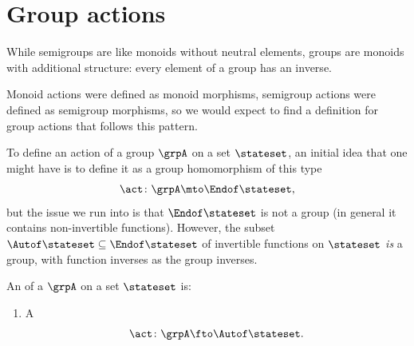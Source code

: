 
\section{Group actions}


While semigroups are like monoids without neutral elements, groups are monoids with additional structure: every element of a group has an inverse.

Monoid actions were defined as monoid morphisms, semigroup actions were defined as semigroup morphisms, so we would expect to find a definition for group actions that follows this pattern. 

To define an action of a group $\grpA$ on a set $\stateset$, an initial idea that one might have is to define it as a group homomorphism of this type
\begin{equation}
\act \colon \grpA \mto \Endof\stateset,
\end{equation}
but the issue we run into is that $\Endof\stateset$ is not a group (in general it contains non-invertible functions). However, the subset $\Autof\stateset \subseteq \Endof\stateset$ of invertible functions on $\stateset$ \emph{is} a group, with function inverses as the group inverses. 

\begin{ctdefinition}
    \label{def:group-cov-action}
    An  of a  $\grpA$ on a set $\stateset$ is:

    \constit
    \begin{enumerate}
        \item A 
              \begin{equation}
                  \label{eq:act-group}
                  \act \colon \grpA \fto \Autof\stateset.
              \end{equation}
    \end{enumerate}
\end{ctdefinition}

